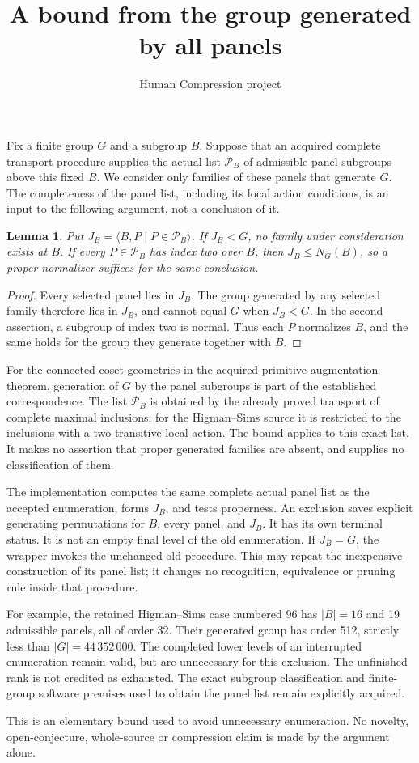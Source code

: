 \documentclass[11pt]{article}
\title{A bound from the group generated by all panels}
\author{Human Compression project}\date{}
\newtheorem{lemma}{Lemma}
\begin{document}
\maketitle
Fix a finite group $G$ and a subgroup $B$. Suppose that an acquired
complete transport procedure supplies the actual list $\mathcal P_B$
of admissible panel subgroups above this fixed $B$. We consider only
families of these panels that generate $G$. The completeness of the
panel list, including its local action conditions, is an input to the
following argument, not a conclusion of it.
\begin{lemma}
Put $J_B=\langle B,P\mid P\in\mathcal P_B\rangle$.
If $J_B<G$, no family under consideration exists at $B$.
If every $P\in\mathcal P_B$ has index two over $B$, then
$J_B\leq N_G(B)$, so a proper normalizer suffices for the same conclusion.
\end{lemma}
\begin{proof}
Every selected panel lies in $J_B$. The group generated by any selected
family therefore lies in $J_B$, and cannot equal $G$ when $J_B<G$.
In the second assertion, a subgroup of index two is normal. Thus each
$P$ normalizes $B$, and the same holds for the group they generate
 together with $B$.
\end{proof}
For the connected coset geometries in the acquired primitive
augmentation theorem, generation of $G$ by the panel subgroups is
part of the established correspondence. The list $\mathcal P_B$ is
obtained by the already proved transport of complete maximal
inclusions; for the Higman--Sims source it is restricted to the
inclusions with a two-transitive local action. The bound applies to
this exact list. It makes no assertion that proper generated families
are absent, and supplies no classification of them.

The implementation computes the same complete actual panel list as the
accepted enumeration, forms $J_B$, and tests properness. An exclusion
saves explicit generating permutations for $B$, every panel, and $J_B$.
It has its own terminal status. It is not an empty final level of the
old enumeration. If $J_B=G$, the wrapper invokes the unchanged old
procedure. This may repeat the inexpensive construction of its panel
list; it changes no recognition, equivalence or pruning rule inside
that procedure.

For example, the retained Higman--Sims case numbered 96 has
$|B|=16$ and 19 admissible panels, all of order 32. Their generated
group has order 512, strictly less than $|G|=44\,352\,000$.
The completed lower levels of an interrupted enumeration remain
valid, but are unnecessary for this exclusion. The unfinished rank
is not credited as exhausted. The exact subgroup classification and
finite-group software premises used to obtain the panel list remain
explicitly acquired.

This is an elementary bound used to avoid unnecessary enumeration.
No novelty, open-conjecture, whole-source or compression claim is
made by the argument alone.
\end{document}
